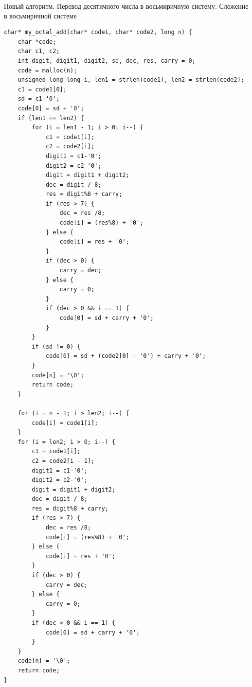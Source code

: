 \documentclass[14pt, russian]{scrartcl}
\begin{document}
\newpage
\begin{code}
\caption{Новый алгоритм. Перевод десятичного числа в восьмиричную систему. Сложение в восьмиричной системе}
\label{lst:octaladd}
\begin{verbatim}
char* my_octal_add(char* code1, char* code2, long n) {
    char *code;
    char c1, c2;
    int digit, digit1, digit2, sd, dec, res, carry = 0;
    code = malloc(n);
    unsigned long long i, len1 = strlen(code1), len2 = strlen(code2);
    c1 = code1[0];
    sd = c1-'0';
    code[0] = sd + '0';
    if (len1 == len2) {
        for (i = len1 - 1; i > 0; i--) {
            c1 = code1[i];
            c2 = code2[i];
            digit1 = c1-'0'; 
            digit2 = c2-'0'; 
            digit = digit1 + digit2;
            dec = digit / 8;
            res = digit%8 + carry;
            if (res > 7) {
                dec = res /8;
                code[i] = (res%8) + '0';
            } else {
                code[i] = res + '0';
            }
            if (dec > 0) {
                carry = dec;
            } else {
                carry = 0;
            }
            if (dec > 0 && i == 1) {
                code[0] = sd + carry + '0';
            }
        } 
        if (sd != 0) {
            code[0] = sd + (code2[0] - '0') + carry + '0';
        }
        code[n] = '\0';
        return code;
    }

    for (i = n - 1; i > len2; i--) {
        code[i] = code1[i];
    }
    for (i = len2; i > 0; i--) {
        c1 = code1[i];
        c2 = code2[i - 1];
        digit1 = c1-'0'; 
        digit2 = c2-'0'; 
        digit = digit1 + digit2;
        dec = digit / 8;
        res = digit%8 + carry;
        if (res > 7) {
            dec = res /8;
            code[i] = (res%8) + '0';
        } else {
            code[i] = res + '0';
        }
        if (dec > 0) {
            carry = dec;
        } else {
            carry = 0;
        }
        if (dec > 0 && i == 1) {
            code[0] = sd + carry + '0';
        }
    } 
    code[n] = '\0';
    return code;
}
\end{verbatim}
\end{code}
\end{document}

